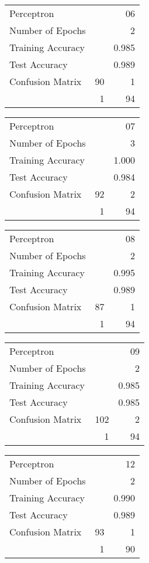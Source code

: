 \documentclass[11pt,twocolumn]{article}
\begin{document}
\begin{center}
\begin{tabular}{l | r r}
Perceptron &&06\\
Number of Epochs & &2\\
Training Accuracy & &0.985\\
Test Accuracy & &0.989\\
Confusion Matrix &90 & 1\\
 &1 & 94\\
\end{tabular}
\end{center}
\begin{center}
\begin{tabular}{l | r r}
Perceptron &&07\\
Number of Epochs & &3\\
Training Accuracy & &1.000\\
Test Accuracy & &0.984\\
Confusion Matrix &92 & 2\\
 &1 & 94\\
\end{tabular}
\end{center}
\begin{center}
\begin{tabular}{l | r r}
Perceptron &&08\\
Number of Epochs & &2\\
Training Accuracy & &0.995\\
Test Accuracy & &0.989\\
Confusion Matrix &87 & 1\\
 &1 & 94\\
\end{tabular}
\end{center}
\begin{center}
\begin{tabular}{l | r r}
Perceptron &&09\\
Number of Epochs & &2\\
Training Accuracy & &0.985\\
Test Accuracy & &0.985\\
Confusion Matrix &102 & 2\\
 &1 & 94\\
\end{tabular}
\end{center}
\begin{center}
\begin{tabular}{l | r r}
Perceptron &&12\\
Number of Epochs & &2\\
Training Accuracy & &0.990\\
Test Accuracy & &0.989\\
Confusion Matrix &93 & 1\\
 &1 & 90\\
\end{tabular}
\end{center}
\end{document}
